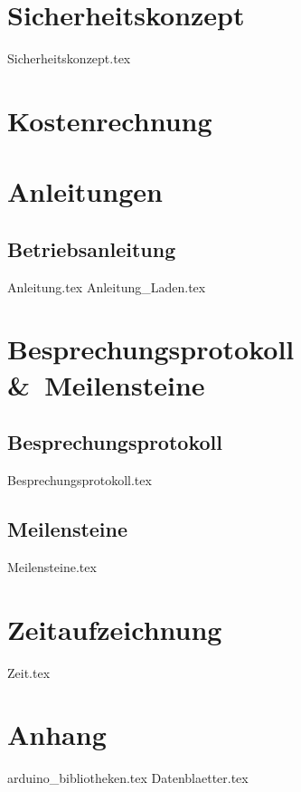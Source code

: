 \documentclass[paper=a4,12pt]{scrreprt}
\begin{document}
\chapter{Sicherheitskonzept}
{Sicherheitskonzept.tex}

\chapter{Kostenrechnung}

\chapter{Anleitungen}
\section{Betriebsanleitung}
{Anleitung.tex}
{Anleitung_Laden.tex}

\chapter{Besprechungsprotokoll \&\ Meilensteine}
\section{Besprechungsprotokoll}
{Besprechungsprotokoll.tex}
\section{Meilensteine}
{Meilensteine.tex}

\chapter{Zeitaufzeichnung}
{Zeit.tex}

\chapter{Anhang}
{arduino_bibliotheken.tex}
{Datenblaetter.tex}
\end{document}

